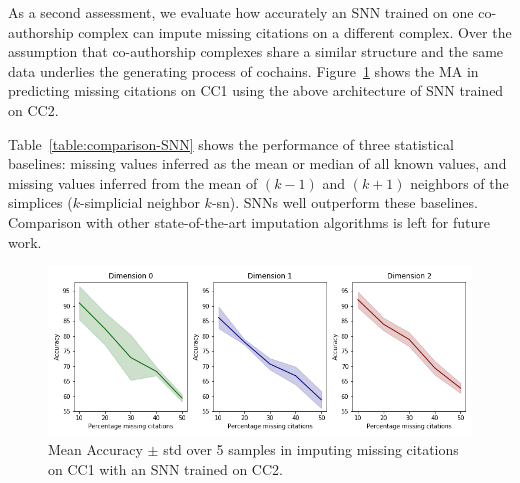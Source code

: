 As a second assessment, we evaluate how accurately an SNN trained on one co-authorship complex can impute missing citations on a different complex. Over the assumption that co-authorship complexes share a similar structure and the same data underlies the generating process of cochains.
Figure~\ref{fig:transfer-learning} shows the MA in predicting missing citations on CC1 using the above architecture of SNN trained on CC2.

Table~\ref{table:comparison-SNN} shows the performance of three statistical baselines: missing values inferred as the mean or median of all known values, and missing values inferred from the mean of $(k-1)$ and $(k+1)$ neighbors of the simplices ($k$-simplicial neighbor $k$-sn). SNNs well outperform these baselines.
Comparison with other state-of-the-art imputation algorithms is left for future work.

\begin{figure}[htbp]
  \centering
\includegraphics[scale=0.35]{./figures/accuracy_network1_pretrained.png}
  \caption{Mean Accuracy $\pm$ std over 5 samples in imputing missing citations on CC1 with an SNN trained on CC2.} \label{fig:transfer-learning}
\end{figure}

